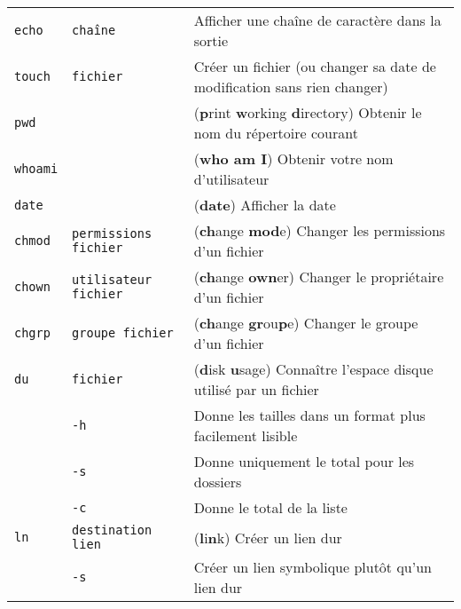 \documentclass [a4paper]{article}
\begin{document}
\noindent
\begin{tabular}{ lll }
\hline
{\verb+echo+}   & \verb+chaîne+              & Afficher une chaîne de caractère dans la sortie \\
{\verb+touch+}  & \verb+fichier+             & Créer un fichier (ou changer sa date de modification sans rien changer) \\
{\verb+pwd+}    &                            & (\textbf{p}rint \textbf{w}orking \textbf{d}irectory) Obtenir le nom du répertoire courant \\
{\verb+whoami+} &                            & (\textbf{who am I}) Obtenir votre nom d'utilisateur \\
{\verb+date+}   &                            & (\textbf{date}) Afficher la date \\
{\verb+chmod+}  & \verb+permissions fichier+ & (\textbf{ch}ange \textbf{mod}e) Changer les permissions d'un fichier \\
{\verb+chown+}  & \verb+utilisateur fichier+ & (\textbf{ch}ange \textbf{own}er) Changer le propriétaire d'un fichier \\
{\verb+chgrp+}  & \verb+groupe fichier+      & (\textbf{ch}ange \textbf{gr}ou\textbf{p}e) Changer le groupe d'un fichier \\
{\verb+du+}     & \verb+fichier+             & (\textbf{d}isk \textbf{u}sage) Connaître l'espace disque utilisé par un fichier \\
                & \hspace{-0.6cm}\verb+-h+                  & \hspace{0.4cm} Donne les tailles dans un format plus facilement lisible \\
                & \hspace{-0.6cm}\verb+-s+                  & \hspace{0.4cm} Donne uniquement le total pour les dossiers\\
                & \hspace{-0.6cm}\verb+-c+                  & \hspace{0.4cm} Donne le total de la liste\\
{\verb+ln+}     & \verb+destination lien+    & (\textbf{l}i\textbf{n}k) Créer un lien dur \\
                & \hspace{-0.6cm}\verb+-s+                  & \hspace{0.4cm} Créer un lien symbolique plutôt qu'un lien dur \\
\hline
\end{tabular}
\end{document}
